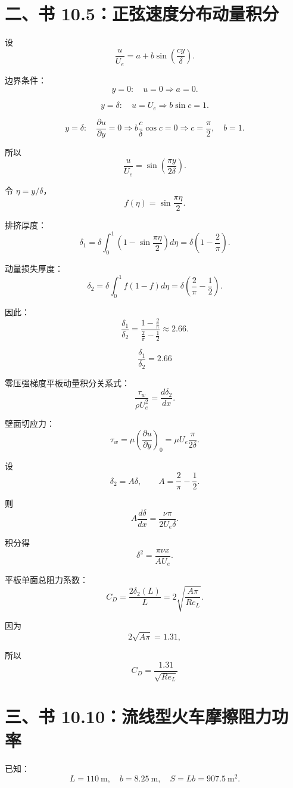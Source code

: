 \documentclass[11pt,a4paper]{ctexart}
\begin{document}
\section*{二、书 10.5：正弦速度分布动量积分}

设
\[
\frac{u}{U_e}=a+b\sin\left(\frac{cy}{\delta}\right).
\]

边界条件：
\[
y=0:\quad u=0\Rightarrow a=0.
\]

\[
y=\delta:\quad u=U_e\Rightarrow b\sin c=1.
\]

\[
y=\delta:\quad \frac{\partial u}{\partial y}=0
\Rightarrow b\frac{c}{\delta}\cos c=0
\Rightarrow c=\frac{\pi}{2},\quad b=1.
\]

所以
\[
\frac{u}{U_e}=\sin\left(\frac{\pi y}{2\delta}\right).
\]

令 \(\eta=y/\delta\)，
\[
f(\eta)=\sin\frac{\pi\eta}{2}.
\]

排挤厚度：
\[
\delta_1=\delta\int_0^1\left(1-\sin\frac{\pi\eta}{2}\right)d\eta
=\delta\left(1-\frac{2}{\pi}\right).
\]

动量损失厚度：
\[
\delta_2=\delta\int_0^1 f(1-f)d\eta
=\delta\left(\frac{2}{\pi}-\frac12\right).
\]

因此：
\[
\frac{\delta_1}{\delta_2}
=\frac{1-\frac{2}{\pi}}{\frac{2}{\pi}-\frac12}
\approx2.66.
\]

\[
\boxed{\frac{\delta_1}{\delta_2}=2.66}
\]

零压强梯度平板动量积分关系式：
\[
\frac{\tau_w}{\rho U_e^2}=\frac{d\delta_2}{dx}.
\]

壁面切应力：
\[
\tau_w=\mu\left(\frac{\partial u}{\partial y}\right)_{0}
=\mu U_e\frac{\pi}{2\delta}.
\]

设
\[
\delta_2=A\delta,\qquad A=\frac{2}{\pi}-\frac12.
\]

则
\[
A\frac{d\delta}{dx}=\frac{\nu\pi}{2U_e\delta}.
\]

积分得
\[
\delta^2=\frac{\pi\nu x}{AU_e}.
\]

平板单面总阻力系数：
\[
C_D=\frac{2\delta_2(L)}{L}
=2\sqrt{\frac{A\pi}{Re_L}}.
\]

因为
\[
2\sqrt{A\pi}=1.31,
\]

所以
\[
\boxed{C_D=\frac{1.31}{\sqrt{Re_L}}}
\]

\section*{三、书 10.10：流线型火车摩擦阻力功率}

已知：
\[
L=110\ \mathrm{m},\quad b=8.25\ \mathrm{m},\quad
S=Lb=907.5\ \mathrm{m^2}.
\]
\end{document}
